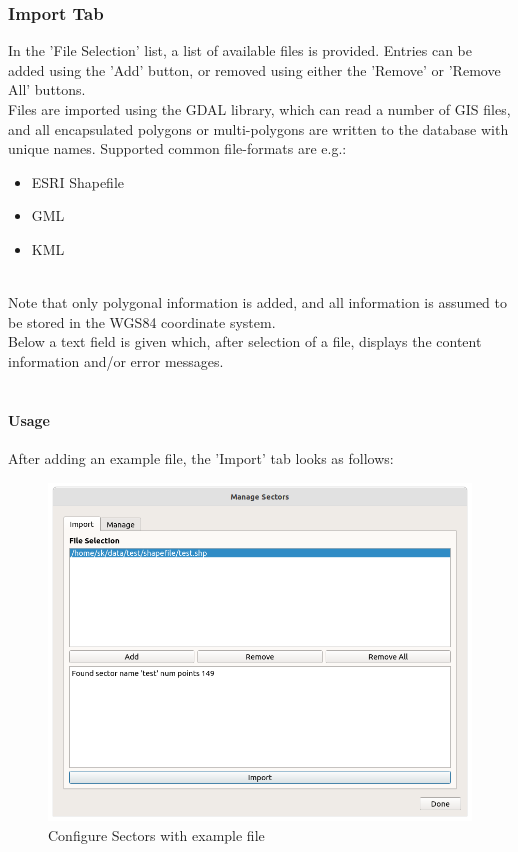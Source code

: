 \subsubsection {Import Tab}

In the 'File Selection' list, a list of available files is provided. Entries can be added using the 'Add' button, or removed using either the 'Remove' or 'Remove All' buttons. \\

Files are imported using the GDAL library, which can read a number of GIS files, and all encapsulated polygons or multi-polygons are written to the database with unique names. Supported common file-formats are e.g.:

\begin{itemize}
\item ESRI Shapefile
\item GML
\item KML
\end{itemize}
\ \\

Note that only polygonal information is added, and all information is assumed to be stored in the WGS84 coordinate system. \\

Below a text field is given which, after selection of a file, displays the content information and/or error messages. \\\

\paragraph {Usage}

After adding an example file, the 'Import' tab looks as follows:

\begin{figure}[H]
    \includegraphics[width=15cm]{figures/configure_sectors_ready.png}
  \caption{Configure Sectors with example file}
\end{figure}


